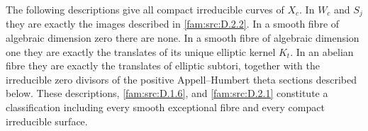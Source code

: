 \begin{theorem}\label{fam:src:D.2.3}\label{fam:st:D.2.3}
The following descriptions give all compact irreducible curves of $X_c$.
In $W_c$ and $S_j$ they are exactly the images described in \ref{fam:src:D.2.2}.
In a smooth fibre of algebraic dimension zero there are none. In a
smooth fibre of algebraic dimension one they are exactly the translates
of its unique elliptic kernel $K_t$. In an abelian fibre they are exactly
the translates of elliptic subtori, together with the irreducible zero
divisors of the positive Appell--Humbert theta sections described below.
These descriptions, \ref{fam:src:D.1.6}, and \ref{fam:src:D.2.1} constitute a classification including
every smooth exceptional fibre and every compact irreducible surface.
\end{theorem}
